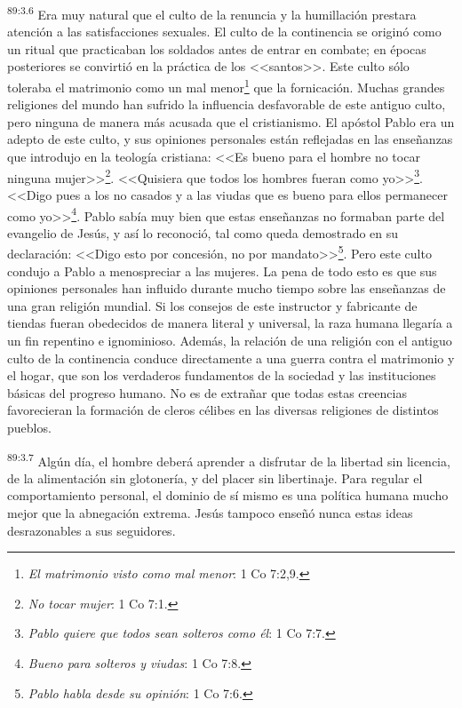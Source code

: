 \par
\textsuperscript{89:3.6} Era muy natural que el culto de la renuncia y la humillación prestara atención a las satisfacciones sexuales. El culto de la continencia se originó como un ritual que practicaban los soldados antes de entrar en combate; en épocas posteriores se convirtió en la práctica de los <<santos>>. Este culto sólo toleraba el matrimonio como un mal menor\footnote{\textit{El matrimonio visto como mal menor}: 1 Co 7:2,9.} que la fornicación. Muchas grandes religiones del mundo han sufrido la influencia desfavorable de este antiguo culto, pero ninguna de manera más acusada que el cristianismo. El apóstol Pablo era un adepto de este culto, y sus opiniones personales están reflejadas en las enseñanzas que introdujo en la teología cristiana: <<Es bueno para el hombre no tocar ninguna mujer>>\footnote{\textit{No tocar mujer}: 1 Co 7:1.}. <<Quisiera que todos los hombres fueran como yo>>\footnote{\textit{Pablo quiere que todos sean solteros como él}: 1 Co 7:7.}. <<Digo pues a los no casados y a las viudas que es bueno para ellos permanecer como yo>>\footnote{\textit{Bueno para solteros y viudas}: 1 Co 7:8.}. Pablo sabía muy bien que estas enseñanzas no formaban parte del evangelio de Jesús, y así lo reconoció, tal como queda demostrado en su declaración: <<Digo esto por concesión, no por mandato>>\footnote{\textit{Pablo habla desde su opinión}: 1 Co 7:6.}. Pero este culto condujo a Pablo a menospreciar a las mujeres. La pena de todo esto es que sus opiniones personales han influido durante mucho tiempo sobre las enseñanzas de una gran religión mundial. Si los consejos de este instructor y fabricante de tiendas fueran obedecidos de manera literal y universal, la raza humana llegaría a un fin repentino e ignominioso. Además, la relación de una religión con el antiguo culto de la continencia conduce directamente a una guerra contra el matrimonio y el hogar, que son los verdaderos fundamentos de la sociedad y las instituciones básicas del progreso humano. No es de extrañar que todas estas creencias favorecieran la formación de cleros célibes en las diversas religiones de distintos pueblos.

\par
\textsuperscript{89:3.7} Algún día, el hombre deberá aprender a disfrutar de la libertad sin licencia, de la alimentación sin glotonería, y del placer sin libertinaje. Para regular el comportamiento personal, el dominio de sí mismo es una política humana mucho mejor que la abnegación extrema. Jesús tampoco enseñó nunca estas ideas desrazonables a sus seguidores.

